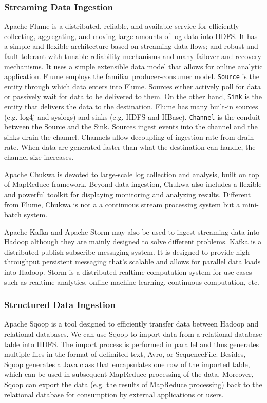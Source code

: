 \documentclass[12pt]{book}
\begin{document}
\subsubsection{Streaming Data Ingestion}
Apache Flume \cite{Flume} is a distributed, reliable, and available service for efficiently collecting, aggregating, and moving large amounts of log data into HDFS. It has a simple and flexible architecture based on streaming data flows; and robust and fault tolerant with tunable reliability mechanisms and many failover and recovery mechanisms. It uses a simple extensible data model that allows for online analytic application. Flume employs the familiar producer-consumer model. \texttt{Source} is the entity through which data enters into Flume. Sources either actively poll for data or passively wait for data to be delivered to them. On the other hand, \texttt{Sink} is the entity that delivers the data to the destination. Flume has many built-in sources (e.g. log4j and syslogs) and sinks (e.g. HDFS and HBase). \texttt{Channel} is the conduit between the Source and the Sink. Sources ingest events into the channel and the sinks drain the channel. Channels allow decoupling of ingestion rate from drain rate. When data are generated faster than what the destination can handle, the channel size increases.

Apache Chukwa \cite{Chukwa} is devoted to large-scale log collection and analysis, built on top of MapReduce framework. Beyond data ingestion, Chukwa also includes a flexible and powerful toolkit for displaying monitoring and analyzing results. Different from Flume, Chukwa is not a a continuous stream processing system but a mini-batch system.

Apache Kafka \cite{Kafka} and Apache Storm \cite{Storm} may also be used to ingest streaming data into Hadoop although they are mainly designed to solve different problems. Kafka is a distributed publish-subscribe messaging system. It is designed to provide high throughput persistent messaging that's scalable and allows for parallel data loads into Hadoop. Storm is a distributed realtime computation system for use cases such as realtime analytics, online machine learning, continuous computation, etc.

\subsubsection{Structured Data Ingestion}
Apache Sqoop \cite{Sqoop} is a tool designed to efficiently transfer data between Hadoop and relational databases. We can use Sqoop to import data from a relational database table into HDFS. The import process is performed in parallel and thus generates multiple files in the format of delimited text, Avro, or SequenceFile. Besides, Sqoop generates a Java class that encapsulates one row of the imported table, which can be used in subsequent MapReduce processing of the data. Moreover, Sqoop can export the data (e.g. the results of MapReduce processing) back to the relational database for consumption by external applications or users.
\end{document}
